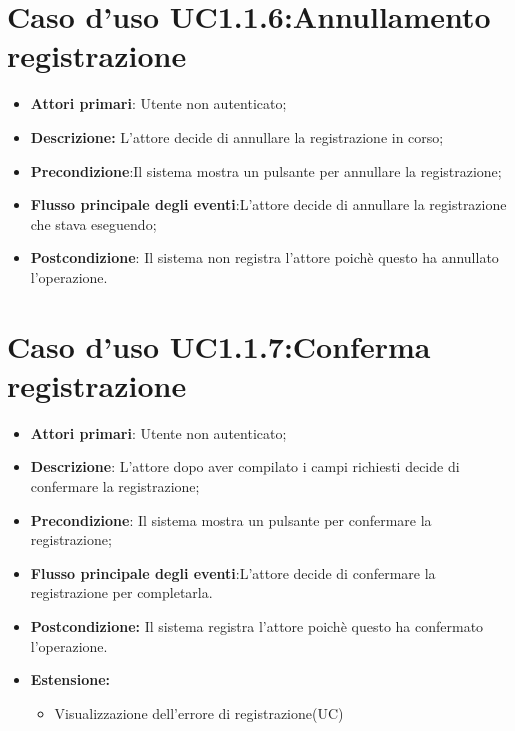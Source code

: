 \section{Caso d'uso UC1.1.6:Annullamento registrazione}
\begin{itemize}
	\item \textbf{Attori primari}: Utente non autenticato;
	\item \textbf{Descrizione:} L'attore decide di annullare la registrazione in corso;
	\item \textbf{Precondizione}:Il sistema mostra un pulsante per annullare la  registrazione;
	\item \textbf{Flusso principale degli eventi}:L'attore decide di annullare la registrazione che stava eseguendo;
	\item \textbf{Postcondizione}: Il sistema non registra l'attore poichè questo ha annullato l'operazione.
\end{itemize}

\section{Caso d'uso UC1.1.7:Conferma registrazione}
\begin{itemize}
	\item \textbf{Attori primari}: Utente non autenticato;
	\item \textbf{Descrizione}: L'attore dopo aver compilato i campi richiesti decide di confermare  la registrazione;
	\item \textbf{Precondizione}: Il sistema mostra un pulsante per confermare la registrazione;
	\item \textbf{Flusso principale degli eventi}:L'attore decide di confermare la registrazione per completarla.
	\item \textbf{Postcondizione:} Il sistema registra l'attore poichè questo ha confermato l'operazione.
	\item \textbf{Estensione:}
	\begin{itemize}
		\item Visualizzazione dell'errore di registrazione(UC)
	\end{itemize}
\end{itemize}

